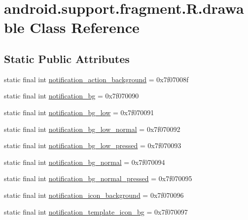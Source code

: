 \hypertarget{classandroid_1_1support_1_1fragment_1_1R_1_1drawable}{}\section{android.\+support.\+fragment.\+R.\+drawable Class Reference}
\label{classandroid_1_1support_1_1fragment_1_1R_1_1drawable}
\subsection*{Static Public Attributes}
\begin{DoxyCompactItemize}
\item 
static final int \mbox{\hyperlink{classandroid_1_1support_1_1fragment_1_1R_1_1drawable_a086af7e7931dbe4e82c720a77fe3d3ae}{notification\+\_\+action\+\_\+background}} = 0x7f07008f
\item 
static final int \mbox{\hyperlink{classandroid_1_1support_1_1fragment_1_1R_1_1drawable_a6f047fed5aab004876674c2a21947011}{notification\+\_\+bg}} = 0x7f070090
\item 
static final int \mbox{\hyperlink{classandroid_1_1support_1_1fragment_1_1R_1_1drawable_ae752bec4177894876af7fe198eef3a93}{notification\+\_\+bg\+\_\+low}} = 0x7f070091
\item 
static final int \mbox{\hyperlink{classandroid_1_1support_1_1fragment_1_1R_1_1drawable_affebf5f3af26bcc00661a293dc1aab89}{notification\+\_\+bg\+\_\+low\+\_\+normal}} = 0x7f070092
\item 
static final int \mbox{\hyperlink{classandroid_1_1support_1_1fragment_1_1R_1_1drawable_ae105cc655521bfd8d0a45fc06338ed5d}{notification\+\_\+bg\+\_\+low\+\_\+pressed}} = 0x7f070093
\item 
static final int \mbox{\hyperlink{classandroid_1_1support_1_1fragment_1_1R_1_1drawable_a58ea29ffeb1ee70047e694a612e479d0}{notification\+\_\+bg\+\_\+normal}} = 0x7f070094
\item 
static final int \mbox{\hyperlink{classandroid_1_1support_1_1fragment_1_1R_1_1drawable_a68c5f11206805023128791be315ec21e}{notification\+\_\+bg\+\_\+normal\+\_\+pressed}} = 0x7f070095
\item 
static final int \mbox{\hyperlink{classandroid_1_1support_1_1fragment_1_1R_1_1drawable_a865ae832f4735278aca10303e960e96c}{notification\+\_\+icon\+\_\+background}} = 0x7f070096
\item 
static final int \mbox{\hyperlink{classandroid_1_1support_1_1fragment_1_1R_1_1drawable_a1edff3cf073bb370d690cfb30db587fc}{notification\+\_\+template\+\_\+icon\+\_\+bg}} = 0x7f070097

\end{DoxyCompactItemize}

